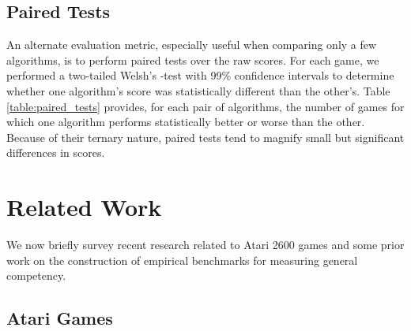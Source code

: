 \documentclass[twoside,11pt]{article}
\begin{document}
\subsection{Paired Tests}

An alternate evaluation metric, especially useful when comparing only a few algorithms, is to perform paired tests over the raw scores. For each game, we performed a two-tailed Welsh's -test with 99\% confidence intervals to determine whether one algorithm's score was statistically different than the other's. Table \ref{table:paired_tests} provides, for each pair of algorithms, the number of games for which one algorithm performs statistically better or worse than the other. Because of their ternary nature, paired tests tend to magnify small but significant differences in scores. 

\section{Related Work}
\label{sec:relatedwork}

We now briefly survey recent research related to Atari 2600 games and some prior work on the construction of empirical benchmarks for measuring general competency.

\subsection{Atari Games}\label{sec:prior_work_on_atari}
\end{document}
